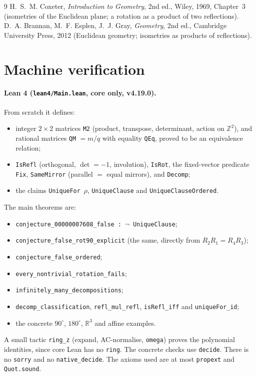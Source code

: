 \documentclass[11pt]{article}
\theoremstyle{definition}
\theoremstyle{remark}
\newcommand{\R}{\mathbb R}
\newcommand{\Z}{\mathbb Z}
\begin{document}
\begin{thebibliography}{9}
 H.~S.~M. Coxeter, \emph{Introduction to Geometry}, 2nd ed., Wiley, 1969,
Chapter~3 (isometries of the Euclidean plane; a rotation as a product of two reflections).
 D.~A. Brannan, M.~F. Esplen, J.~J. Gray, \emph{Geometry}, 2nd ed., Cambridge
University Press, 2012 (Euclidean geometry; isometries as products of reflections).
\end{thebibliography}

\section{Machine verification}

\paragraph{Lean 4 (\texttt{lean4/Main.lean}, core only, v4.19.0).} From scratch it defines:
\begin{itemize}
\item integer $2\times2$ matrices \texttt{M2} (product, transpose, determinant, action on
$\Z^2$), and rational matrices \texttt{QM} $=m/q$ with equality \texttt{QEq}, proved to be an
equivalence relation;
\item \texttt{IsRefl} (orthogonal, $\det=-1$, involution), \texttt{IsRot}, the fixed-vector
predicate \texttt{Fix}, \texttt{SameMirror} (parallel $=$ equal mirrors), and \texttt{Decomp};
\item the claims \texttt{UniqueFor}~$\rho$, \texttt{UniqueClause} and
\texttt{UniqueClauseOrdered}.
\end{itemize}
The main theorems are:
\begin{itemize}
\item \texttt{conjecture\_00000007608\_false : $\neg$ UniqueClause};
\item \texttt{conjecture\_false\_rot90\_explicit} (the same, directly from $R_2R_1=R_4R_3$);
\item \texttt{conjecture\_false\_ordered};
\item \texttt{every\_nontrivial\_rotation\_fails};
\item \texttt{infinitely\_many\_decompositions};
\item \texttt{decomp\_classification}, \texttt{refl\_mul\_refl}, \texttt{isRefl\_iff} and
\texttt{uniqueFor\_id};
\item the concrete $90^\circ$, $180^\circ$, $\R^3$ and affine examples.
\end{itemize}
A small tactic \texttt{ring\_z} (expand, AC-normalise, \texttt{omega}) proves the polynomial
identities, since core Lean has no \texttt{ring}. The concrete checks use \texttt{decide}. There
is no \texttt{sorry} and no \texttt{native\_decide}. The axioms used are at most
\texttt{propext} and \texttt{Quot.sound}.
\end{document}
